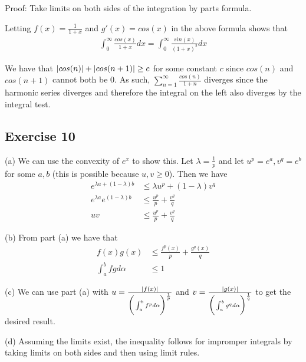 Proof: Take limits on both sides of the integration by parts formula.

Letting $f(x) = \frac{1}{1 + x}$ and $g'(x) = cos(x)$ in the above formula shows that 
\begin{align*}
        \int_{0}^{\infty} \frac{cos(x)}{1 + x} dx = \int_{0}^{\infty} \frac{sin(x)}{(1 + x)^2} dx  
\end{align*}

We have that $\abs{cos(n)} + \abs{cos(n + 1)} \geq c$ for some
constant $c$ since $cos(n)$ and $cos(n + 1)$ cannot both be 0. As such, 
$\sum_{n = 1}^\infty \frac{cos(n)}{1 + n}$ diverges since the harmonic series diverges and therefore
the integral on the left also diverges by the integral test.

\subsection{Exercise 10}
(a) We can use the convexity of $e^x$ to show this. Let $\lambda = \frac{1}{p}$ and let $u^p = e^a, v^q = e^b$
for some $a, b$ (this is possible because $u, v \geq 0$). Then we have
\begin{align*}
        e^{\lambda a + (1- \lambda) b} &\leq \lambda u^p + (1 - \lambda) v^q \\
        e^{\lambda a} e^{(1 - \lambda) b} &\leq \frac{u^p}{p} + \frac{v^q}{q} \\
        uv &\leq \frac{u^p}{p} + \frac{v^q}{q}
\end{align*}

(b) From part (a) we have that 
\begin{align*}
        f(x) g(x) &\leq \frac{f^p(x)}{p} + \frac{g^q(x)}{q} \\
        \int_{a}^{b} fg d\alpha &\leq 1 
\end{align*}

(c) We can use part (a) with  $u = \frac{\abs{f(x)}}{\bigg(\int_{a}^{b} f^p d\alpha\bigg)^{\frac{1}{p}}}$ 
and $v = \frac{\abs{g(x)}}{\bigg(\int_{a}^{b} g^q d\alpha\bigg)^{\frac{1}{q}}}$ to get the desired result.

(d) Assuming the limits exist, the inequality follows for impromper integrals by taking limits on both sides
and then using limit rules.
